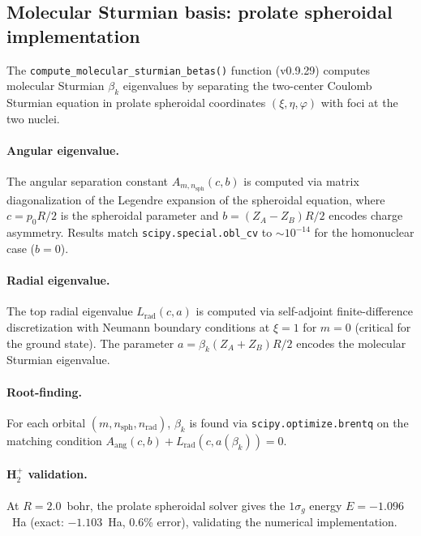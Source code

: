 \documentclass[aps,pra,twocolumn,superscriptaddress,longbibliography,floatfix]{revtex4-2}
\begin{document}
\subsection{Molecular Sturmian basis: prolate spheroidal implementation}
\label{sec:prolate}

The \texttt{compute\_molecular\_sturmian\_betas()} function (v0.9.29)
computes molecular Sturmian $\beta_k$ eigenvalues by separating the
two-center Coulomb Sturmian equation in prolate spheroidal coordinates
$(\xi, \eta, \varphi)$ with foci at the two nuclei.

\paragraph{Angular eigenvalue.}
The angular separation constant $A_{m,n_{\text{sph}}}(c, b)$ is computed
via matrix diagonalization of the Legendre expansion of the spheroidal
equation, where $c = p_0 R/2$ is the spheroidal parameter and
$b = (Z_A - Z_B)R/2$ encodes charge asymmetry.  Results match
\texttt{scipy.special.obl\_cv} to $\sim 10^{-14}$ for the homonuclear
case ($b = 0$).

\paragraph{Radial eigenvalue.}
The top radial eigenvalue $L_{\text{rad}}(c, a)$ is computed via
self-adjoint finite-difference discretization with Neumann boundary
conditions at $\xi = 1$ for $m = 0$ (critical for the ground state).
The parameter $a = \beta_k (Z_A + Z_B) R / 2$ encodes the molecular
Sturmian eigenvalue.

\paragraph{Root-finding.}
For each orbital $(m, n_{\text{sph}}, n_{\text{rad}})$, $\beta_k$ is
found via \texttt{scipy.optimize.brentq} on the matching condition
$A_{\text{ang}}(c, b) + L_{\text{rad}}(c, a(\beta_k)) = 0$.

\paragraph{H$_2^+$ validation.}
At $R = 2.0$~bohr, the prolate spheroidal solver gives the $1\sigma_g$
energy $E = -1.096$~Ha (exact: $-1.103$~Ha, 0.6\% error), validating
the numerical implementation.
\end{document}
